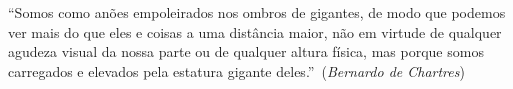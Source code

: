 \begin{epigrafe}

\vspace*{\fill}

\begin{flushright}

\small

\textquotedblleft Somos como anões empoleirados nos ombros de gigantes, de modo que podemos ver mais do que eles e coisas a uma distância maior, não em virtude de qualquer agudeza visual da nossa parte ou de qualquer altura física, mas porque somos carregados e elevados pela estatura gigante deles.\textquotedblright \
(\textit{Bernardo de Chartres})

\end{flushright}

\end{epigrafe}

\cleardoublepage
